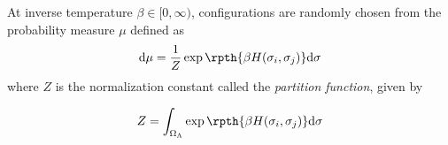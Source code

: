 	\begin{ndefi}
		At inverse temperature $\beta \in [0,\infty)$, configurations are randomly chosen from the 
		probability measure $\mu$ defined as
		\begin{equation}
			\mathrm{d}\mu = \frac{1}{Z} \exp\rpth{{\beta H(\sigma_i, \sigma_j)}} \mathrm{d}\sigma
		\end{equation}
		where $Z$ is the normalization constant called the \textit{partition function}, given by

		\begin{equation}
			Z = \int_{\Omega_{\Lambda}} \exp\rpth{\beta H(\sigma_i, \sigma_j)} \mathrm{d}\sigma
		\end{equation}
	\end{ndefi}



